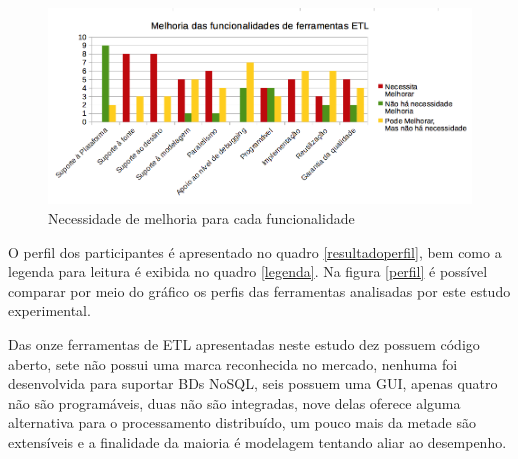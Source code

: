 \begin{figure}[h]
	\centering
	\includegraphics[scale=0.4]{fig/melhorias.png}
	\caption{Necessidade de melhoria para cada funcionalidade}
	\label{melhoria}
\end{figure}


O perfil dos participantes é apresentado no quadro \ref{resultadoperfil}, bem como a legenda para leitura é exibida no quadro \ref{legenda}. Na figura \ref{perfil} é possível comparar por meio do gráfico os perfis das ferramentas analisadas por este estudo experimental. 

Das onze ferramentas de ETL apresentadas neste estudo dez possuem código aberto, sete não possui uma marca reconhecida no mercado, nenhuma foi desenvolvida para suportar BDs NoSQL, seis possuem uma GUI, apenas quatro não são programáveis, duas não são integradas, nove delas oferece alguma alternativa para o processamento distribuído, um pouco mais da metade são extensíveis e a finalidade da maioria é modelagem tentando aliar ao desempenho.

